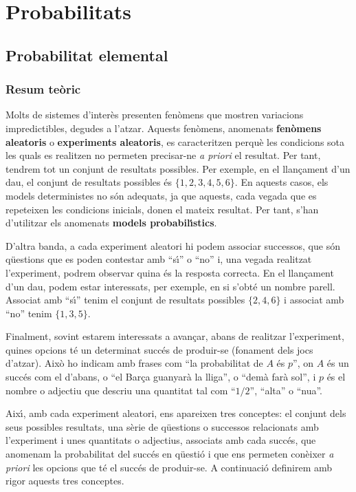 \part{Probabilitats}

\chapter{Probabilitat elemental}

\section{Resum te\`oric}

Molts de sistemes d'inter\`es presenten fen\`omens que mostren variacions
impredictibles, degudes a l'atzar. Aquests fen\`omens, anomenats {\bf fen\`omens
aleatoris} o {\bf experiments
aleatoris}, es caracteritzen perqu\`e les
condicions sota les quals es realitzen no permeten precisar-ne {\it a priori} el
resultat. Per tant, tendrem tot un conjunt de resultats possibles. Per exemple,
en el llan\c{c}ament d'un dau, el conjunt de resultats possibles \'es
$\{1,2,3,4,5,6\}$. En aquests casos, els models  deterministes no s\'on
adequats, ja que aquests, cada vegada que es repeteixen les condicions inicials,
donen el mateix resultat. Per tant, s'han d'utilitzar els anomenats {\bf models
probabil\'{\i}stics}.

D'altra banda, a cada experiment aleatori hi podem associar
successos, que s\'on q\"uestions que es poden contestar
amb ``s\'{\i}'' o ``no'' i, una vegada realitzat l'experiment, podrem observar
quina \'es la resposta correcta. En el llan\c{c}ament d'un dau, podem estar
interessats, per exemple, en si s'obt\'e un nombre parell. Associat amb 
``s\'{\i}'' tenim el conjunt de resultats possibles $\{2,4,6\}$ i associat 
amb ``no'' tenim $\{1,3,5\}$.

Finalment, sovint estarem interessats a avan\c{c}ar, abans de realitzar
l'experiment, quines opcions t\'e un determinat succ\'es de produir-se
(fonament dels jocs d'atzar). Aix\`o ho indicam amb frases com ``la
probabilitat de $A$ \'es $p$'', on $A$ \'es un succ\'es com
el d'abans, o ``el Bar\c{c}a guanyar\`a la lliga'', o ``dem\`a far\`a sol'', 
i $p$ \'es el nombre o adjectiu que descriu una quantitat tal com 
``$1/2$'', ``alta'' o ``nu{\lgem}a''.

Aix\'{\i}, amb cada experiment aleatori, ens apareixen tres conceptes: el conjunt
dels seus possibles resultats, una s\`erie de q\"uestions o successos 
relacionats amb l'experiment i unes quantitats o adjectius, associats amb
cada succ\'es, que anomenam la probabilitat del succ\'es en
q\"uesti\'o i que ens permeten con\`eixer {\it a priori} les opcions que t\'e el
succ\'es de produir-se. A continuaci\'o definirem amb rigor aquests tres 
conceptes.

